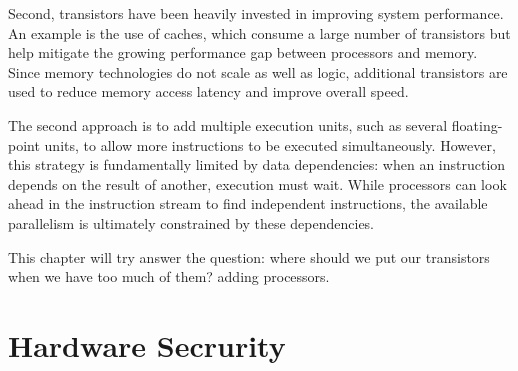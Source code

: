 \documentclass{book}
\begin{document}
Second, transistors have been heavily invested in improving system performance. An example is the use of caches, which consume a large number of transistors but help mitigate the growing performance gap between processors and memory. Since memory technologies do not scale as well as logic, additional transistors are used to reduce memory access latency and improve overall speed.

The second approach is to add multiple execution units, such as several floating-point units, to allow more instructions to be executed simultaneously. However, this strategy is fundamentally limited by data dependencies: when an instruction depends on the result of another, execution must wait. While processors can look ahead in the instruction stream to find independent instructions, the available parallelism is ultimately constrained by these dependencies.

This chapter will try answer the question: where should we put our transistors when we have too much of them? \textrightarrow adding processors.




\chapter{Hardware Secrurity}

\end{document}
